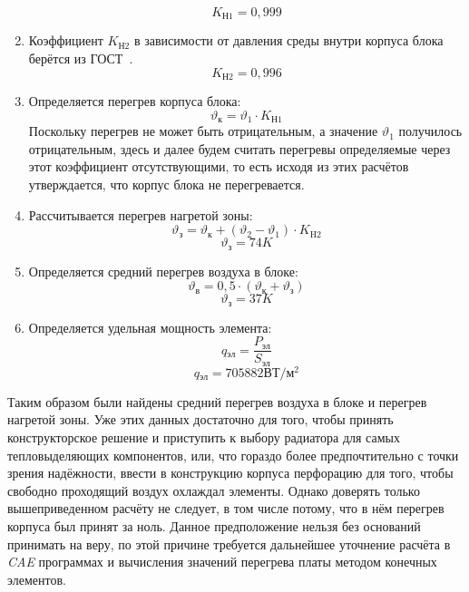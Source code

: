 \begin{enumerate}
%
  $$K\mathrm{_{Н1}} = 0,999$$
%
  \item Коэффициент $K\mathrm{_{Н2}}$ в зависимости от давления
  среды внутри корпуса блока берётся из ГОСТ~\cite{GOST-15150-69}.
%
  $$K\mathrm{_{Н2}} = 0,996$$
%
\item Определяется перегрев корпуса блока:
%
  \begin{equation}
    \vartheta\mathrm{_к} = \vartheta_1 \cdot K\mathrm{_{Н1}}
  \end{equation}
%
  Поскольку перегрев не может быть отрицательным, а значение
$\vartheta_1$ получилось отрицательным, здесь и далее будем считать
перегревы определяемые через этот коэффициент отсутствующими, то есть
исходя из этих расчётов утверждается, что корпус блока не
перегревается.
%
\item Рассчитывается перегрев нагретой зоны:
%
  \begin{equation}
    \vartheta\mathrm{_з} = \vartheta\mathrm{_к} + (\vartheta_2 - \vartheta_1) \cdot K\mathrm{_{H2}}
  \end{equation}
%
    $$\vartheta\mathrm{_з} = 74K$$
%
\item Определяется средний перегрев воздуха в блоке:
%
  \begin{equation}
      \vartheta\mathrm{_в} = 0,5 \cdot (\vartheta\mathrm{_к} + \vartheta\mathrm{_з})
    \end{equation}
% 
    $$\vartheta\mathrm{_з} = 37K$$
\item Определяется удельная мощность элемента:
    \begin{equation}
      q\mathrm{_{эл}} = \frac{P\mathrm{_{эл}}}{S\mathrm{_{эл}}}
    \end{equation}
    $$q\mathrm{_{эл}} = 705882\mathrm{ВТ/м^2} $$
\end{enumerate}
%  
Таким образом были найдены средний перегрев воздуха в блоке и перегрев
нагретой зоны. Уже этих данных достаточно для того, чтобы принять
конструкторское решение и приступить к выбору радиатора для самых
тепловыделяющих компонентов, или, что гораздо более предпочтительно с
точки зрения надёжности, ввести в конструкцию корпуса перфорацию для
того, чтобы свободно проходящий воздух охлаждал элементы.
%
Однако доверять только вышеприведенном расчёту не следует,
в том числе потому, что в нём перегрев корпуса был принят за ноль.
Данное предположение нельзя без оснований принимать на веру,
по этой причине требуется дальнейшее уточнение расчёта в \textit{CAE}
программах и вычисления значений перегрева платы методом конечных элементов.

